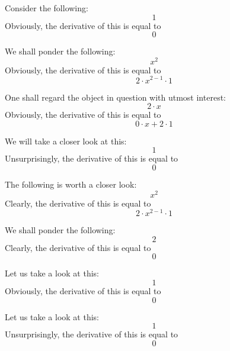 \documentclass{article}
\begin{document}
Consider the following:
\begin{equation}
1 
\end{equation}
Obviously, the derivative of this is equal to
\begin{equation}
0 
\end{equation}

We shall ponder the following:
\begin{equation}
x ^{2 } 
\end{equation}
Obviously, the derivative of this is equal to
\begin{equation}
2 \cdot x ^{2 - 1 } \cdot 1 
\end{equation}

One shall regard the object in question with utmost interest:
\begin{equation}
2 \cdot x 
\end{equation}
Obviously, the derivative of this is equal to
\begin{equation}
0 \cdot x + 2 \cdot 1 
\end{equation}

We will take a closer look at this:
\begin{equation}
1 
\end{equation}
Unsurprisingly, the derivative of this is equal to
\begin{equation}
0 
\end{equation}

The following is worth a closer look:
\begin{equation}
x ^{2 } 
\end{equation}
Clearly, the derivative of this is equal to
\begin{equation}
2 \cdot x ^{2 - 1 } \cdot 1 
\end{equation}

We shall ponder the following:
\begin{equation}
2 
\end{equation}
Clearly, the derivative of this is equal to
\begin{equation}
0 
\end{equation}

Let us take a look at this:
\begin{equation}
1 
\end{equation}
Obviously, the derivative of this is equal to
\begin{equation}
0 
\end{equation}

Let us take a look at this:
\begin{equation}
1 
\end{equation}
Unsurprisingly, the derivative of this is equal to
\begin{equation}
0 
\end{equation}
\end{document}

